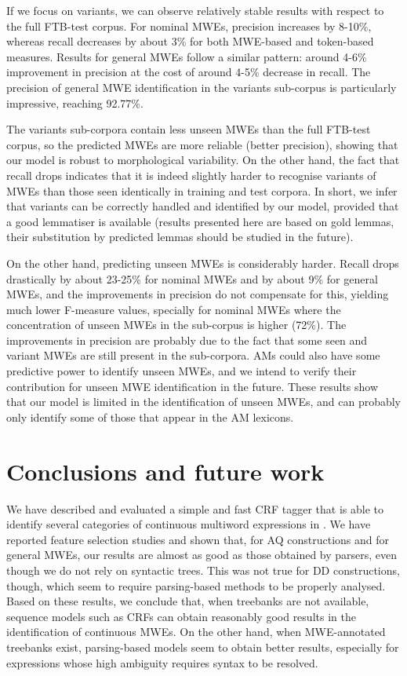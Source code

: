 \documentclass[output=paper,modfonts]{langscibook}
\begin{document}
If we focus on variants, we can observe relatively stable results with respect to the full FTB-test corpus. For nominal MWEs, precision increases by 8-10\%, whereas recall decreases by about 3\% for both MWE-based and token-based measures. Results for general MWEs follow a similar pattern: around 4-6\% improvement in precision at the cost of around 4-5\% decrease in recall. The precision of general MWE identification in the variants sub-corpus is particularly impressive, reaching 92.77\%.

The variants sub-corpora contain less unseen MWEs than the full FTB-test corpus, so the predicted MWEs are more reliable (better precision), showing that our model is robust to morphological variability. On the other hand, the fact that recall drops indicates that it is indeed slightly harder to recognise variants of MWEs than those seen identically in training and test corpora. In short, we infer that variants can be correctly handled and identified by our model, provided that a good lemmatiser is available (results presented here are based on gold lemmas, their substitution by predicted lemmas should be studied in the future).

On the other hand, predicting unseen MWEs is considerably harder. Recall drops drastically by about 23-25\% for nominal MWEs and by about 9\% for general MWEs, and the improvements in precision do not compensate for this, yielding much lower F-measure values, specially for nominal MWEs where the concentration of unseen MWEs in the sub-corpus is higher (72\%). The improvements in precision are probably due to the fact that some seen and variant MWEs are still present in the sub-corpora. AMs could also have some predictive power to identify unseen MWEs, and we intend to verify their contribution for unseen MWE identification in the future. These results show that our model is limited in the identification of unseen MWEs, and can probably only identify some of those that appear in the AM lexicons.


\section{Conclusions and future work}
\label{schol:sec:concl}

We have described and evaluated a simple and fast CRF tagger that is able to identify several categories of continuous multiword expressions in . We have reported feature selection studies and shown that, for AQ constructions and for general MWEs, our results are almost as good as those obtained by parsers, even though we do not rely on syntactic trees. This was not true for DD constructions, though, which seem to require parsing-based methods to be properly analysed. Based on these results, we conclude that, when treebanks are not available, sequence models such as CRFs can obtain reasonably good results in the identification of continuous MWEs. On the other hand, when MWE-annotated treebanks exist, parsing-based models seem to obtain better results, especially for expressions whose high ambiguity requires syntax to be resolved.
\end{document}
